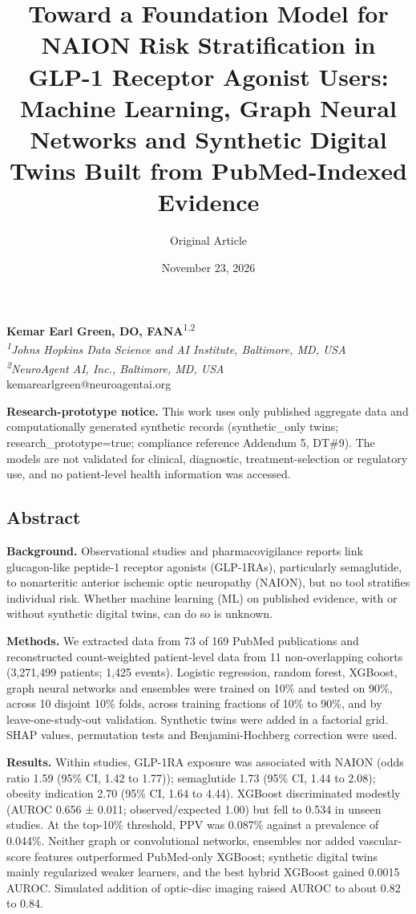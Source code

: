\documentclass[
  11pt,
]{article}
\title{Toward a Foundation Model for NAION Risk Stratification in GLP-1
Receptor Agonist Users: Machine Learning, Graph Neural Networks and
Synthetic Digital Twins Built from PubMed-Indexed Evidence}
\subtitle{Original Article}
\author{}
\date{November 23, 2026}
\begin{document}
\maketitle

\textbf{Kemar Earl Green, DO, FANA}\textsuperscript{1,2}\\
\emph{\textsuperscript{1}Johns Hopkins Data Science and AI Institute,
Baltimore, MD, USA}\\
\emph{\textsuperscript{2}NeuroAgent AI, Inc., Baltimore, MD, USA}\\
kemarearlgreen@neuroagentai.org

\textbf{Research-prototype notice.} This work uses only published
aggregate data and computationally generated synthetic records
(synthetic\_only twins; research\_prototype=true; compliance reference
Addendum 5, DT\#9). The models are not validated for clinical,
diagnostic, treatment-selection or regulatory use, and no patient-level
health information was accessed.

\subsection{Abstract}\label{abstract}

\textbf{Background.} Observational studies and pharmacovigilance reports
link glucagon-like peptide-1 receptor agonists (GLP-1RAs), particularly
semaglutide, to nonarteritic anterior ischemic optic neuropathy (NAION),
but no tool stratifies individual risk. Whether machine learning (ML) on
published evidence, with or without synthetic digital twins, can do so
is unknown.

\textbf{Methods.} We extracted data from 73 of 169 PubMed publications
and reconstructed count-weighted patient-level data from 11
non-overlapping cohorts (3,271,499 patients; 1,425 events). Logistic
regression, random forest, XGBoost, graph neural networks and ensembles
were trained on 10\% and tested on 90\%, across 10 disjoint 10\% folds,
across training fractions of 10\% to 90\%, and by leave-one-study-out
validation. Synthetic twins were added in a factorial grid. SHAP values,
permutation tests and Benjamini-Hochberg correction were used.

\textbf{Results.} Within studies, GLP-1RA exposure was associated with
NAION (odds ratio 1.59 (95\% CI, 1.42 to 1.77)); semaglutide 1.73 (95\%
CI, 1.44 to 2.08); obesity indication 2.70 (95\% CI, 1.64 to 4.44).
XGBoost discriminated modestly (AUROC 0.656 ± 0.011; observed/expected
1.00) but fell to 0.534 in unseen studies. At the top-10\% threshold,
PPV was 0.087\% against a prevalence of 0.044\%. Neither graph or
convolutional networks, ensembles nor added vascular-score features
outperformed PubMed-only XGBoost; synthetic digital twins mainly
regularized weaker learners, and the best hybrid XGBoost gained 0.0015
AUROC. Simulated addition of optic-disc imaging raised AUROC to about
0.82 to 0.84.
\end{document}
